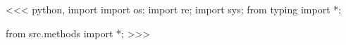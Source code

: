 <<< python, import
    import os;
    import re;
    import sys;
    from typing import *;

    from src.methods import *;
>>>
